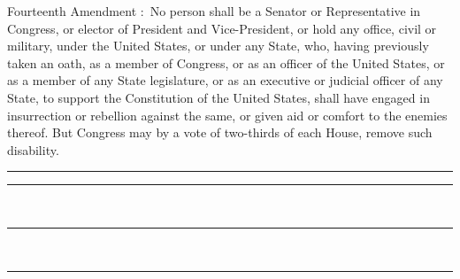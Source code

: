 \documentclass{article}
\begin{document}
	\fmmfamily \Large
	Fourteenth Amendment :\ 
	No person shall be a Senator or Representative in Congress, or
	elector of President and Vice-President, or hold any office, civil
	or military, under the United States, or under any State, who,
	having previously taken an oath, as a member of Congress, or as an
	officer of the United States, or as a member of any State
	legislature, or as an executive or judicial officer of any State, to
	support the Constitution of the United States, shall have engaged in
	insurrection or rebellion against the same, or given aid or comfort
	to the enemies thereof. But Congress may by a vote of two-thirds of
	each House, remove such disability.
\hfill{}
\newpage 


\begin{minipage}{0.5\textwidth}
\hspace{\textwidth}
\rule{.5pt}{\textheight}
\end{minipage}
\begin{minipage}{0.5\textwidth}
\vspace{24pt}
\noindent\hspace{12pt}\rule{5cm}{0.4pt}\\

\noindent\hspace{12pt}\rule{5cm}{0.4pt}\\

\noindent\hspace{12pt}\rule{5cm}{0.4pt}
\vfill
\end{minipage}
\end{document}
